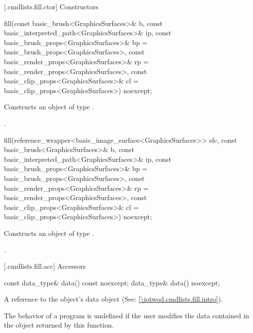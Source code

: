  [\iotwod.cmdlists.fill.ctor] {Constructors}%

%
\begin{itemdecl}
fill(const basic_brush<GraphicsSurfaces>& b,
  const basic_interpreted_path<GraphicsSurfaces>& ip,
  const basic_brush_props<GraphicsSurfaces>& bp = 
  basic_brush_props<GraphicsSurfaces>{},
  const basic_render_props<GraphicsSurfaces>& rp = 
  basic_render_props<GraphicsSurfaces>{},
  const basic_clip_props<GraphicsSurfaces>& cl = 
  basic_clip_props<GraphicsSurfaces>{}) noexcept;
\end{itemdecl}
\begin{itemdescr}
\pnum
\effects Constructs an object of type .

\pnum
\postconditions {}.
\end{itemdescr}

%
\begin{itemdecl}
fill(reference_wrapper<basic_image_surface<GraphicsSurfaces>> sfc,
  const basic_brush<GraphicsSurfaces>& b,
  const basic_interpreted_path<GraphicsSurfaces>& ip,
  const basic_brush_props<GraphicsSurfaces>& bp = 
  basic_brush_props<GraphicsSurfaces>{},
  const basic_render_props<GraphicsSurfaces>& rp = 
  basic_render_props<GraphicsSurfaces>{},
  const basic_clip_props<GraphicsSurfaces>& cl = 
  basic_clip_props<GraphicsSurfaces>{}) noexcept;
\end{itemdecl}
\begin{itemdescr}
\pnum
\effects Constructs an object of type .

\pnum
\postconditions {}.
\end{itemdescr}

 [\iotwod.cmdlists.fill.acc] {Accessors}%

%
\begin{itemdecl}
const data_type& data() const noexcept;
data_type& data() noexcept;
\end{itemdecl}
\begin{itemdescr}
\pnum
\returns A reference to the  object's data object (See: \ref{\iotwod.cmdlists.fill.intro}).

\pnum
\remarks The behavior of a program is undefined if the user modifies the data contained in the  object returned by this function.
\end{itemdescr}


